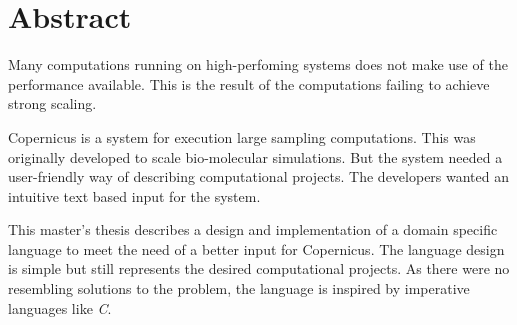 \begingroup
\let\clearpage\relax
\let\cleardoublepage\relax
\let\cleardoublepage\relax

\chapter*{Abstract}

Many computations running on high-perfoming systems does not make use
of the performance available. This is the result of the computations
failing to achieve strong scaling.

Copernicus is a system for execution large sampling computations. This
was originally developed to scale bio-molecular simulations. But the
system needed a user-friendly way of describing computational
projects. The developers wanted an intuitive text based input for the
system.

This master's thesis describes a design and implementation of a domain
specific language to meet the need of a better input for
Copernicus. The language design is simple but still represents the
desired computational projects. As there were no resembling solutions
to the problem, the language is inspired by imperative languages
like \emph{C}.


\endgroup			

\vfill
